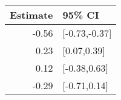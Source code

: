 \begin{tabular}{rl}
  \hline
Estimate & 95\% CI \\ 
  \hline
-0.56 & [-0.73,-0.37] \\ 
  0.23 & [0.07,0.39] \\ 
  0.12 & [-0.38,0.63] \\ 
  -0.29 & [-0.71,0.14] \\ 
   \hline
\end{tabular}

